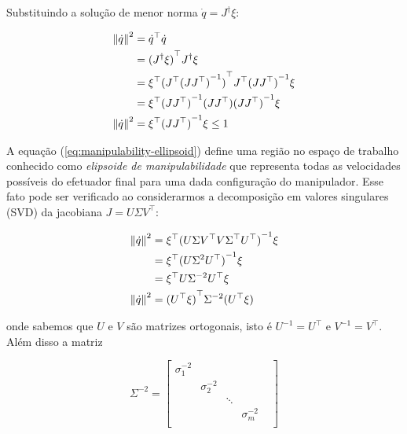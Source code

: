 Substituindo a solução de menor norma \(\dot{q} = J^\dag \xi\):

\begin{align}\label{eq:manipulability-ellipsoid}
    \left\Vert \dot{q} \right\Vert^2 & = \dot{q}^\top \dot{q} \notag                                                    \\
                                     & = {(J^\dag \xi)}^\top J^\dag \xi \notag                                          \\
                                     & = \xi^\top {(J^\top {(J J^\top)}^{-1})}^\top J^\top {(J J^\top)}^{-1} \xi \notag \\
                                     & = \xi^\top {(J J^\top)}^{-1} (J J^\top) {(J J^\top)}^{-1} \xi \notag             \\
    \left\Vert \dot{q} \right\Vert^2 & = \xi^\top {(J J^\top)}^{-1} \xi \leq 1
\end{align}

A equação (\ref{eq:manipulability-ellipsoid}) define uma região no espaço de
trabalho conhecido como \emph{elipsoide de manipulabilidade} que representa
todas as velocidades possíveis do efetuador final para uma dada configuração do
manipulador. Esse fato pode ser verificado ao considerarmos a
decomposição em valores singulares (SVD) da jacobiana \(J = U \Sigma V^\top\):

\begin{align}\label{eq:manipulability-ellipsoid-svd}
    \left\Vert \dot{q} \right\Vert^2 & = \xi^\top {(U \Sigma V^\top V \Sigma^\top U^\top)}^{-1} \xi \notag \\
                                     & = \xi^\top {(U \Sigma^2 U^\top)}^{-1} \xi \notag                    \\
                                     & = \xi^\top U \Sigma^{-2} U^\top \xi \notag                          \\
    \left\Vert \dot{q} \right\Vert^2 & = {(U^\top \xi)}^\top \Sigma^{-2} (U^\top \xi)
\end{align}

onde sabemos que \(U\) e \(V\) são matrizes ortogonais, isto é \(U^{-1} =
U^\top\) e \(V^{-1} = V^\top\). Além disso a matriz

\begin{equation}
    \Sigma^{-2} = \begin{bmatrix}
        \sigma_1^{-2} &               &        &               & \\
                      & \sigma_2^{-2} &        &               & \\
                      &               & \ddots &               & \\
                      &               &        & \sigma_m^{-2} & \\
    \end{bmatrix}
\end{equation}

